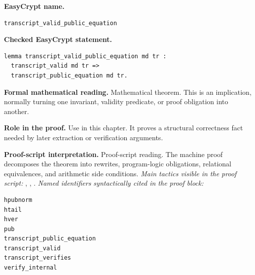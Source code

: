 \begin{formaltheorem}
\noindent\textbf{EasyCrypt name.}
\begin{lstlisting}[language=EasyCrypt,basicstyle=\ttfamily\scriptsize]
transcript_valid_public_equation
\end{lstlisting}
\noindent\textbf{Checked EasyCrypt statement.}
\begin{lstlisting}[language=EasyCrypt,basicstyle=\ttfamily\scriptsize]
lemma transcript_valid_public_equation md tr :
  transcript_valid md tr =>
  transcript_public_equation md tr.
\end{lstlisting}
\noindent\textbf{Formal mathematical reading.}
Mathematical theorem. This is an implication, normally turning one invariant, validity predicate, or proof obligation into another.

\noindent\textbf{Role in the proof.}
Use in this chapter. It proves a structural correctness fact needed by later extraction or verification arguments.

\noindent\textbf{Proof-script interpretation.}
Proof-script reading. The machine proof decomposes the theorem into rewrites, program-logic obligations, relational equivalences, and arithmetic side conditions.
\emph{Main tactics visible in the proof script:} , , .
\emph{Named identifiers syntactically cited in the proof block:}
\begin{lstlisting}[language=EasyCrypt,basicstyle=\ttfamily\scriptsize]
hpubnorm
htail
hver
pub
transcript_public_equation
transcript_valid
transcript_verifies
verify_internal
\end{lstlisting}

\end{formaltheorem}

